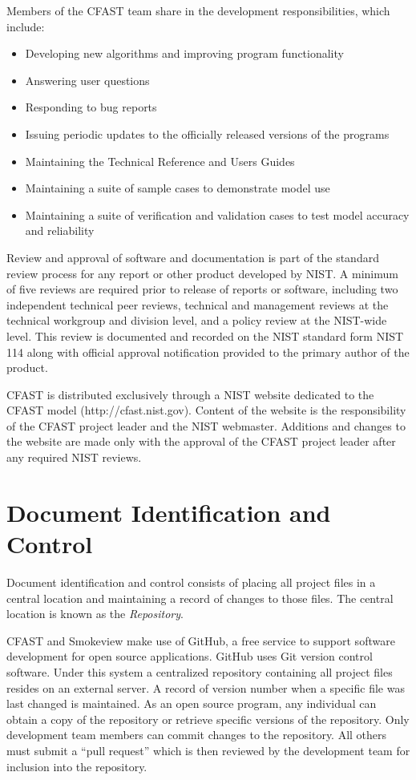 \documentclass[12pt]{book}
\begin{document}
Members of the CFAST team share in the development responsibilities, which include:
\begin{itemize}
\item Developing new algorithms and improving program functionality
\item Answering user questions
\item Responding to bug reports
\item Issuing periodic updates to the officially released versions of the programs
\item Maintaining the Technical Reference and Users Guides
\item Maintaining a suite of sample cases to demonstrate model use
\item Maintaining a suite of verification and validation cases to test model accuracy and reliability
\end{itemize}

Review and approval of software and documentation is part of the standard review process for any report or other product developed by NIST. A minimum of five reviews are required prior to release of reports or software, including two independent technical peer reviews, technical and management reviews at the technical workgroup and division level, and a policy review at the NIST-wide level.  This review is documented and recorded on the NIST standard form NIST 114 along with official approval notification provided to the primary author of the product.

CFAST is distributed exclusively through a NIST website dedicated to the CFAST model (http://cfast.nist.gov).  Content of the website is the responsibility of the CFAST project leader and the NIST webmaster. Additions and changes to the website are made only with the approval of the CFAST project leader after any required NIST reviews.

\section{Document Identification and Control}

Document identification and control consists of placing all project files in a central location and maintaining a record of changes to those files. The central location is known as the {\em Repository}.

CFAST and Smokeview make use of GitHub, a free service to support software development for open source applications. GitHub uses Git version control software. Under this system a centralized repository containing all project files resides on an external server.   A record of version number when a specific file was last changed is maintained. As an open source program, any individual can obtain a copy of the repository or retrieve specific versions of the repository. Only development team members can commit changes to the repository. All others must submit a “pull request” which is then reviewed by the development team for inclusion into the repository.
\end{document}
